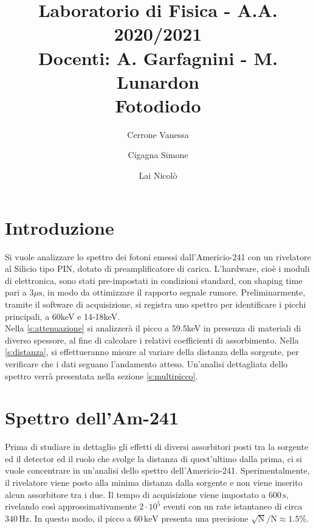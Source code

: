 \documentclass[twocolumn,10pt]{asme2ej}
\date{}
\title{{\huge\bfseries Laboratorio di Fisica} - {\LARGE A.A. 2020/2021} \\ 
    {\LARGE Docenti: A. Garfagnini - M. Lunardon} \\ {\Huge\bfseries Fotodiodo}}
\author{Cerrone Vanessa
    \affiliation{
    1200361\\
    vanessa.cerrone@studenti.unipd.it
    }	
}
\author{Cigagna Simone
    \affiliation{
	1193992\\
    simone.cigagna@studenti.unipd.it
    }	
}
\author{Lai Nicolò
    \affiliation{
	1193976\\
    nicolo.lai@studenti.unipd.it
    }	
}
\begin{document}
\maketitle    


\section{Introduzione}\label{s:introduzione}

Si vuole analizzare lo spettro dei fotoni emessi dall'Americio-241 con un rivelatore al Silicio tipo PIN, dotato di
preamplificatore di carica. L’hardware, cioè i moduli di elettronica, sono stati pre-impostati in condizioni standard,
con shaping time pari a $3\mu\si{\second}$, in modo da ottimizzare il rapporto segnale rumore. Preliminarmente, tramite
il software di acquisizione, si registra uno spettro per identificare i picchi principali, a 60keV e 14-18keV. \\

Nella \autoref{s:attenuazione} si analizzerà il picco a 59.5keV in presenza di materiali di diverso spessore, al fine di
calcolare i relativi coefficienti di assorbimento. Nella  \autoref{s:distanza}, si effettueranno misure al variare della
distanza della sorgente, per verificare che i dati seguano l'andamento atteso. Un'analisi dettagliata dello spettro
verrà presentata nella sezione \autoref{s:multipicco}. 




\section{Spettro dell'Am-241}\label{s:spettro}

Prima di studiare in dettaglio gli effetti di diversi assorbitori posti tra la sorgente ed il detector ed il ruolo che
svolge la distanza di quest'ultimo dalla prima, ci si vuole concentrare in un'analisi dello spettro dell'Americio-241.
Sperimentalmente, il rivelatore viene posto alla minima distanza dalla sorgente e non viene inserito alcun assorbitore
tra i due. Il tempo di acquisizione viene impostato a $600\,\si{\second}$, rivelando così approssimativamente $2 \cdot
10^5$ eventi con un rate istantaneo di circa $340\,\si{\hertz}$. In questo modo, il picco a
$60\,\si{\kilo\electronvolt}$ presenta una precisione $\sqrt{\text{N}}/\text{N} \approx 1.5\%$.
\end{document}
